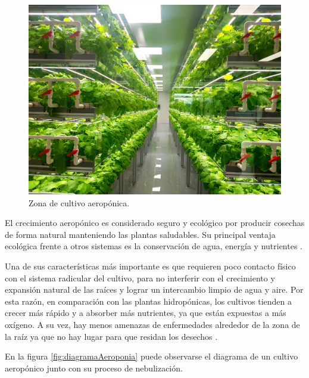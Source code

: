 \begin{figure}[htbp]
	\centering
	\includegraphics[width=.9\textwidth]{./Figures/Zona de cultivo aeroponica.jpg}
	\caption{Zona de cultivo aeropónica\protect\footnotemark.}
	\label{fig:zonaDeCultivoAeroponica}
\end{figure}



El crecimiento aeropónico es considerado seguro y ecológico por producir cosechas de forma natural manteniendo las plantas saludables. Su principal ventaja ecológica frente a otros sistemas es la conservación de agua, energía y nutrientes  \citep{WEBSITE:AEROPONIA2}. 

Una de sus características más importante es que requieren poco contacto físico con el sistema radicular del cultivo, para no interferir con el crecimiento y expansión natural de las raíces y lograr un intercambio limpio de agua y aire. Por esta razón, en comparación con las plantas hidropónicas, los cultivos tienden a crecer más rápido y a absorber más nutrientes, ya que están expuestas a más oxígeno. A su vez, hay menos amenazas de enfermedades alrededor de la zona de la raíz ya que no hay lugar para que residan los desechos \citep{WEBSITE:AEROPONIA3}.

En la figura \ref{fig:diagramaAeroponia} puede observarse el diagrama de un cultivo aeropónico junto con su proceso de nebulización. 

